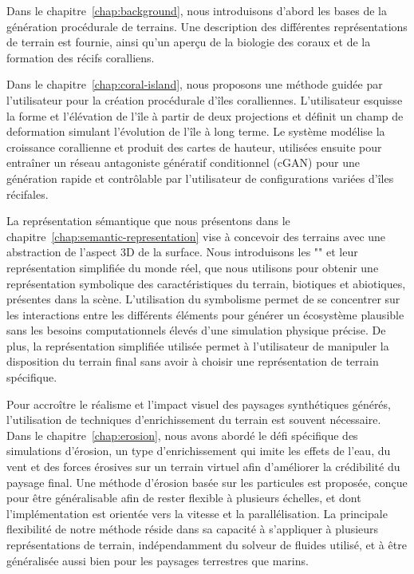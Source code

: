 Dans le chapitre~\ref{chap:background}, nous introduisons d'abord les bases de la génération procédurale de terrains. Une description des différentes représentations de terrain est fournie, ainsi qu'un aperçu de la biologie des coraux et de la formation des récifs coralliens.

    Dans le chapitre~\ref{chap:coral-island}, nous proposons une méthode guidée par l'utilisateur pour la création procédurale d'îles coralliennes. L'utilisateur esquisse la forme et l'élévation de l'île à partir de deux projections et définit un champ de deformation simulant l'évolution de l'île à long terme. Le système modélise la croissance corallienne et produit des cartes de hauteur, utilisées ensuite pour entraîner un réseau antagoniste génératif conditionnel (cGAN) pour une génération rapide et contrôlable par l'utilisateur de configurations variées d'îles récifales.

    La représentation sémantique que nous présentons dans le chapitre~\ref{chap:semantic-representation} vise à concevoir des terrains avec une abstraction de l'aspect 3D de la surface. Nous introduisons les "" et leur représentation simplifiée du monde réel, que nous utilisons pour obtenir une représentation symbolique des caractéristiques du terrain, biotiques et abiotiques, présentes dans la scène. L'utilisation du symbolisme permet de se concentrer sur les interactions entre les différents éléments pour générer un écosystème plausible sans les besoins computationnels élevés d'une simulation physique précise. De plus, la représentation simplifiée utilisée permet à l'utilisateur de manipuler la disposition du terrain final sans avoir à choisir une représentation de terrain spécifique.

    Pour accroître le réalisme et l'impact visuel des paysages synthétiques générés, l'utilisation de techniques d'enrichissement du terrain est souvent nécessaire. Dans le chapitre~\ref{chap:erosion}, nous avons abordé le défi spécifique des simulations d'érosion, un type d'enrichissement qui imite les effets de l'eau, du vent et des forces érosives sur un terrain virtuel afin d'améliorer la crédibilité du paysage final. Une méthode d'érosion basée sur les particules est proposée, conçue pour être généralisable afin de rester flexible à plusieurs échelles, et dont l'implémentation est orientée vers la vitesse et la parallélisation. La principale flexibilité de notre méthode réside dans sa capacité à s'appliquer à plusieurs représentations de terrain, indépendamment du solveur de fluides utilisé, et à être généralisée aussi bien pour les paysages terrestres que marins.








